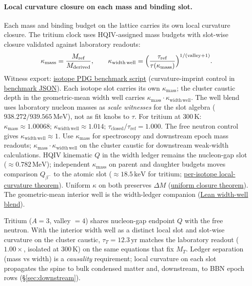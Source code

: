 \documentclass[11pt,notitlepage]{amsart}
\begin{document}
\paragraph{Local curvature closure on each mass and binding slot.}
Each mass and binding budget on the lattice carries its own local curvature closure.
The tritium clock uses HQIV-assigned mass budgets with slot-wise closure validated
against laboratory readouts:
\[
  \kappa_{\mathrm{mass}}=\frac{M_{\mathrm{ref}}}{M_{\mathrm{derived}}},
  \qquad
  \kappa_{\mathrm{width\,well}}
    =\Bigl(\frac{\tau_{\mathrm{ref}}}{\tau(\kappa_{\mathrm{mass}})}\Bigr)^{1/(\mathrm{valley}+1)}.
\]
Witness export: \hyperref[app:scripts]{isotope PDG benchmark script}
(curvature-imprint control in \hyperref[app:scripts]{benchmark JSON}).
Each isotope slot carries its own $\kappa_{\mathrm{mass}}$; the cluster caustic depth
in the geometric-mean width well carries
$\kappa_{\mathrm{mass}}\cdot\kappa_{\mathrm{width\,well}}$.
The well blend uses laboratory nucleon masses as \emph{scale witnesses} for the slot
algebra ($938.272/939.565\,\mathrm{MeV}$), not as fit knobs to $\tau$.
For tritium at $300\,\mathrm{K}$: $\kappa_{\mathrm{mass}}\approx 1.00068$;
$\kappa_{\mathrm{width\,well}}\approx 1.014$;
$\tau_{\mathrm{closed}}/\tau_{\mathrm{ref}}=1.000$.
The free neutron control gives $\kappa_{\mathrm{width\,well}}\approx 1$.
Use $\kappa_{\mathrm{mass}}$ for spectroscopy and downstream epoch mass readouts;
$\kappa_{\mathrm{mass}}\cdot\kappa_{\mathrm{width\,well}}$ on the cluster caustic for
downstream weak-width calculations. HQIV kinematic $Q$ in the width ledger remains the
nucleon-gap slot ($\approx 0.782\,\mathrm{MeV}$); independent $\kappa_{\mathrm{mass}}$
on parent and daughter budgets moves comparison $Q_{\beta^-}$ to the atomic slot
($\approx 18.5\,\mathrm{keV}$ for tritium;
\hyperref[lean:endpoint-q-per-isotope-imprint]{per-isotope local-curvature theorem}).
Uniform $\kappa$ on both preserves $\Delta M$
(\hyperref[lean:endpoint-q-uniform-imprint]{uniform closure theorem}).
The geometric-mean interior well is the width-ledger companion
(\hyperref[lean:width-well-geometric-blend]{Lean width-well blend}).

Tritium ($A=3$, valley $=4$) shares nucleon-gap endpoint $Q$ with the free neutron.
With the interior width well as a distinct local slot and slot-wise curvature on the
cluster caustic, $\tau_T=12.3\,\mathrm{yr}$ matches the laboratory readout
($1.00\times$, isolated at $300\,\mathrm{K}$) on the same equations that fix $M_T$.
Ledger separation (mass vs width) is a \emph{causality} requirement; local curvature
on each slot propagates the spine to bulk condensed matter and, downstream, to BBN epoch rows
(\S\ref{sec:downstream}).
\end{document}
